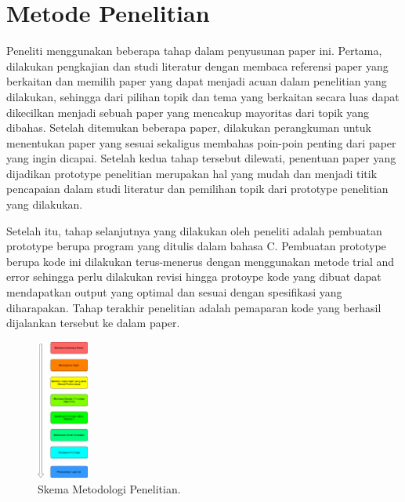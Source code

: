\documentclass[conference]{IEEEtran}
\begin{document}
\section{Metode Penelitian}
    Peneliti menggunakan beberapa tahap dalam penyusunan
    paper ini. Pertama, dilakukan pengkajian dan studi literatur
    dengan membaca referensi paper yang berkaitan dan memilih
    paper yang dapat menjadi acuan dalam penelitian yang dilakukan, sehingga dari pilihan topik dan tema yang berkaitan
    secara luas dapat dikecilkan menjadi sebuah paper yang mencakup mayoritas dari topik yang dibahas. Setelah ditemukan
    beberapa paper, dilakukan perangkuman untuk menentukan
    paper yang sesuai sekaligus membahas poin-poin penting
    dari paper yang ingin dicapai. Setelah kedua tahap tersebut
    dilewati, penentuan paper yang dijadikan prototype penelitian
    merupakan hal yang mudah dan menjadi titik pencapaian
    dalam studi literatur dan pemilihan topik dari prototype penelitian yang dilakukan.

    Setelah itu, tahap selanjutnya yang dilakukan oleh peneliti
    adalah pembuatan prototype berupa program yang ditulis
    dalam bahasa C. Pembuatan prototype berupa kode ini dilakukan terus-menerus dengan menggunakan metode trial and
    error sehingga perlu dilakukan revisi hingga protoype kode
    yang dibuat dapat mendapatkan output yang optimal dan
    sesuai dengan spesifikasi yang diharapakan. Tahap terakhir
    penelitian adalah pemaparan kode yang berhasil dijalankan tersebut ke dalam paper.

    \begin{figure}[H]
        \centerline{\includegraphics[width=0.15\textwidth]{./sources/metodologi_penelitian.png}}
        \caption{Skema Metodologi Penelitian.}
        \label{fig2}
    \end{figure}

\end{document}
